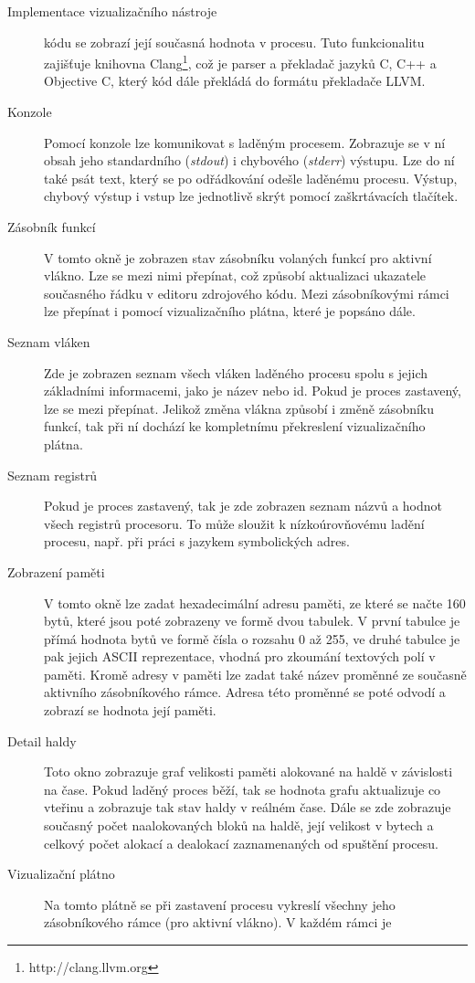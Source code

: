 \documentclass[czech,bachelor,male,python,dept460]{diploma}						%
\begin{document}
\begin{section}{Implementace vizualizačního nástroje}
\begin{description}
			kódu se zobrazí její současná hodnota v procesu. Tuto funkcionalitu zajišťuje knihovna Clang\footnote{http://clang.llvm.org}, což je parser a překladač
			jazyků C, C++ a Objective C, který kód dále překládá do formátu překladače LLVM.
		\item[Konzole] Pomocí konzole lze komunikovat s laděným procesem. Zobrazuje se v ní obsah jeho standardního (\textit{stdout}) i chybového (\textit{stderr})
			výstupu. Lze do ní také psát text, který se po odřádkování odešle laděnému procesu. Výstup, chybový výstup i vstup lze jednotlivě skrýt pomocí
			zaškrtávacích tlačítek.
		\item[Zásobník funkcí] V tomto okně je zobrazen stav zásobníku volaných funkcí pro aktivní vlákno. Lze se mezi nimi přepínat, což způsobí aktualizaci
			ukazatele současného řádku v editoru zdrojového kódu. Mezi zásobníkovými rámci lze přepínat i pomocí vizualizačního plátna, které je popsáno dále.
		\item[Seznam vláken] Zde je zobrazen seznam všech vláken laděného procesu spolu s jejich základními informacemi, jako je název nebo id. Pokud je proces
			zastavený, lze se mezi přepínat. Jelikož změna vlákna způsobí i změně zásobníku funkcí, tak při ní dochází ke kompletnímu překreslení vizualizačního
			plátna.
		\item[Seznam registrů]
			Pokud je proces zastavený, tak je zde zobrazen seznam názvů a hodnot všech registrů procesoru. To může sloužit k nízkoúrovňovému ladění procesu, např.
			při práci s jazykem symbolických adres.
		\item[Zobrazení paměti] V tomto okně lze zadat hexadecimální adresu paměti, ze které se načte 160 bytů, které jsou poté zobrazeny ve formě dvou tabulek.
			V první tabulce je přímá hodnota bytů ve formě čísla o rozsahu 0 až 255, ve druhé tabulce je pak jejich ASCII reprezentace, vhodná pro zkoumání textových
			polí v paměti. Kromě adresy v paměti lze zadat také název proměnné ze současně aktivního zásobníkového rámce. Adresa této proměnné se poté odvodí
			a zobrazí se hodnota její paměti.
		\item[Detail haldy]
			Toto okno zobrazuje graf velikosti paměti alokované na haldě v závislosti na čase. Pokud laděný proces běží, tak se hodnota grafu aktualizuje co vteřinu
			a zobrazuje tak stav haldy v reálném čase. Dále se zde zobrazuje současný počet naalokovaných bloků na haldě, její velikost v bytech a celkový počet
			alokací a dealokací zaznamenaných od spuštění procesu.
		\item[Vizualizační plátno] Na tomto plátně se při zastavení procesu vykreslí všechny jeho zásobníkového rámce (pro aktivní vlákno). V každém rámci je

\end{description}
\end{section}
\end{document}
